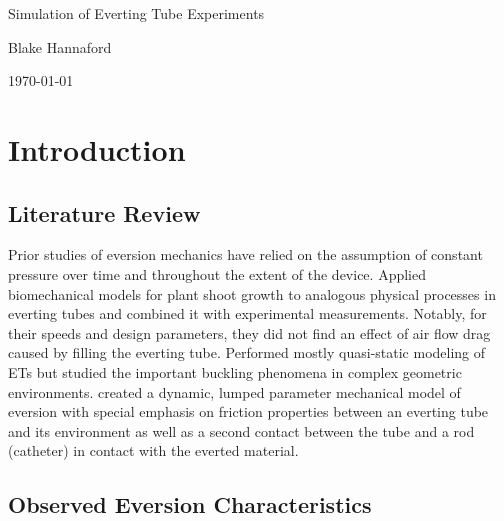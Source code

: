 \documentclass[letterpaper]{article}
\begin{document}
\begin{centering}
{\Large   Simulation of Everting Tube Experiments}

Blake Hannaford

\today

\end{centering}

\section{Introduction}

\subsection{Literature Review}

Prior studies of eversion mechanics have relied on the assumption of constant
pressure over time and throughout the extent of the device.
\cite{blumenschein2017modeling}
Applied biomechanical models for plant shoot growth to analogous physical
processes in everting tubes and combined it with experimental measurements.
Notably, for their speeds and design parameters, they did not find an
effect of air flow drag caused by filling the everting tube.
\cite{Hawkes2017} Performed mostly quasi-static modeling of ETs
but studied the important buckling phenomena in complex geometric
environments.
\cite{vartholomeos2024lumped} created a dynamic, lumped parameter
mechanical model
of eversion with special emphasis on friction properties between
an everting tube and its environment as well as a second contact
between the tube and a rod (catheter) in contact with the
everted material.

\subsection{Observed Eversion Characteristics}
\end{document}
